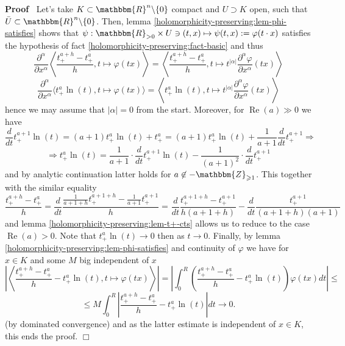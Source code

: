 \documentclass{article}
\newcommand{\assign}{:=}
\newcommand{\nin}{\not\in}
\newcommand{\tmop}[1]{\ensuremath{\operatorname{#1}}}
\renewenvironment{proof}{\noindent\textbf{Proof\ }}{\hspace*{\fill}$\Box$\medskip}
\theoremstyle{remark}
\begin{document}
\begin{proof}
  Let's take $K \subset \mathbbm{R}^n \backslash \{ 0 \}$ compact and $U
  \supset K$ open, such that $\bar{U} \subset \mathbbm{R}^n \backslash \{ 0
  \}$. Then, lemma \ref{holomorphicity-preserving:lem-phi-satisfies} shows
  that $\psi : \mathbbm{R}_{> 0} \times U \ni (t, x) \mapsto \psi (t, x)
  \assign \varphi (t \cdot x)$ satisfies the hypothesis of fact
  \ref{holomorphicity-preserving:fact-basic} and thus
  \[ \frac{\partial^{\alpha}}{\partial x^{\alpha}} \left\langle \frac{t_+^{a +
     h} - t_+^a}{h}, t \mapsto \varphi (t x) \right\rangle = \left\langle
     \frac{t_+^{a + h} - t_+^a}{h}, t \mapsto t^{| \alpha |}
     \frac{\partial^{\alpha} \varphi}{\partial x^{\alpha}} (t x) \right\rangle
  \]
  \[ \frac{\partial^{\alpha}}{\partial x^{\alpha}} \langle t_+^a \ln (t), t
     \mapsto \varphi (t x) \rangle = \left\langle t_+^a \ln (t), t \mapsto
     t^{| \alpha |} \frac{\partial^{\alpha} \varphi}{\partial x^{\alpha}} (t
     x) \right\rangle \]
  hence we may assume that $| \alpha | = 0$ from the start. Moreover, for
  $\tmop{Re} (a) \gg 0$ we have
  \[ \frac{d}{d t} t_+^{a + 1} \ln (t) = (a + 1) t_+^a \ln (t) + t_+^a = (a +
     1) t_+^a \ln (t) + \frac{1}{a + 1} \frac{d}{d t} t_+^{a + 1} \Rightarrow
  \]
  \[ \Rightarrow t_+^a \ln (t) = \frac{1}{a + 1} \cdot \frac{d}{d t} t_+^{a +
     1} \ln (t) - \frac{1}{(a + 1)^2} \cdot \frac{d}{d t} t^{a + 1}_+ \]
  and by analytic continuation latter holds for $a \nin
  -\mathbbm{Z}_{\geqslant 1}$. This together with the similar equality
  \[ \frac{t_+^{a + h} - t_+^a}{h} = \frac{d}{d t} \frac{\frac{1}{a + 1 + h}
     t_+^{a + 1 + h} - \frac{1}{a + 1} t_+^{a + 1}}{h} =^{} \frac{d}{d t}
     \frac{t_+^{a + 1 + h} - t_+^{a + 1}}{h (a + 1 + h)} - \frac{d}{d t}
     \frac{t_+^{a + 1}}{(a + 1 + h) (a + 1)} \]
  and lemma \ref{holomorphicity-preserving:lem-t+-cts} allows us to reduce to
  the case $\tmop{Re} (a) > 0$. Note that $t_+^a \ln (t) \rightarrow 0$ then
  as $t \rightarrow 0$. Finally, by lemma
  \ref{holomorphicity-preserving:lem-phi-satisfies} and continuity of
  $\varphi$ we have for $x \in K$ and some $M$ big independent of $x$
  \[ \left| \left\langle \frac{t_+^{a + h} - t_+^a}{h} - t_+^a \ln (t), t
     \mapsto \varphi (t x) \right\rangle \right| = \left| \int_0^R \left(
     \frac{t_+^{a + h} - t_+^a}{h} - t_+^a \ln (t) \right) \varphi (t x) d t
     \right| \leqslant \]
  \[ \leqslant M \int_0^R \left| \frac{t_+^{a + h} - t_+^a}{h} - t_+^a \ln (t)
     \right| d t \rightarrow 0. \]
  (by dominated convergence) and as the latter estimate is independent of $x
  \in K$, this ends the proof.
\end{proof}
\end{document}
